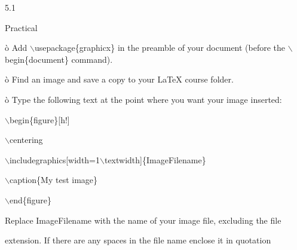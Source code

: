 \documentclass[a4paper,portrait,12pt]{article}
\begin{document}
5.1





\begin{flushleft}
Practical
\end{flushleft}





\begin{flushleft}
\`{o} Add \ensuremath{\backslash}usepackage\{graphicx\} in the preamble of your document (before the \ensuremath{\backslash}begin\{document\} command).
\end{flushleft}


\begin{flushleft}
\`{o} Find an image and save a copy to your LaTeX course folder.
\end{flushleft}


\begin{flushleft}
\`{o} Type the following text at the point where you want your image inserted:
\end{flushleft}


\begin{flushleft}
\ensuremath{\backslash}begin\{figure\}[h!]
\end{flushleft}


\begin{flushleft}
\ensuremath{\backslash}centering
\end{flushleft}


\begin{flushleft}
\ensuremath{\backslash}includegraphics[width=1\ensuremath{\backslash}textwidth]\{ImageFilename\}
\end{flushleft}


\begin{flushleft}
\ensuremath{\backslash}caption\{My test image\}
\end{flushleft}


\begin{flushleft}
\ensuremath{\backslash}end\{figure\}
\end{flushleft}


\begin{flushleft}
Replace ImageFilename with the name of your image file, excluding the file
\end{flushleft}


\begin{flushleft}
extension. If there are any spaces in the file name enclose it in quotation
\end{flushleft}
\end{document}
